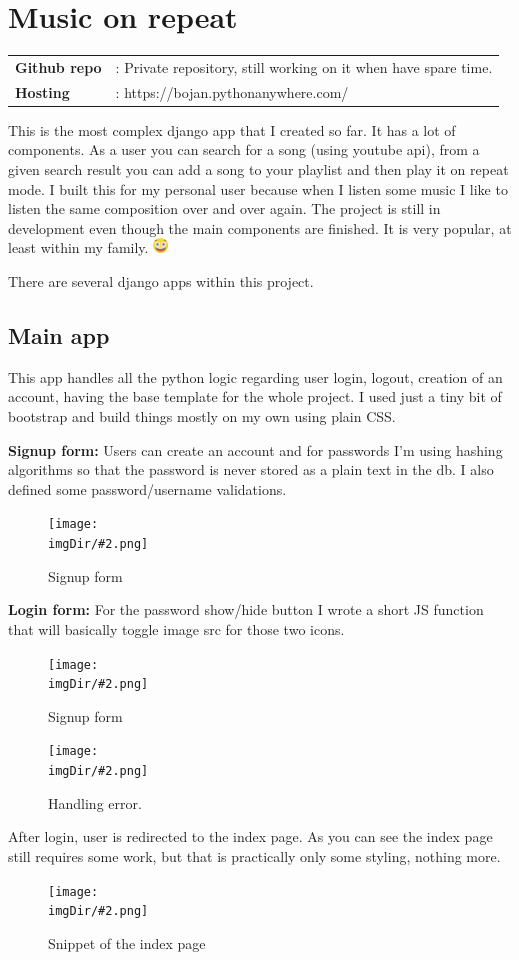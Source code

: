 \documentclass[11pt, onecolumn]{article}
\newcommand{\demo}[2]{%
	\vspace{3mm}
	\begin{tabular}{ll}
		\textbf{Github repo} & : \color{blue}#1\vspace{1mm}\\
		\vspace{2mm}\textbf{Hosting} & : \color{blue}#2 \\
	\end{tabular}
	\vspace{3mm}
}
\newcommand{\fig}[3]{%
	\vspace{-2mm}
	\begin{figure}[H]
		\centering
		\texttt{[image: \\imgDir/\#2.png]}
		\vspace{-3mm}
		\caption[]{#3}
		\label{fig:#2}
	\end{figure}
	\vspace{-2mm}
}
\def\smiley{\includegraphics[width=4mm]{743267}}
\begin{document}
\tableofcontents

\pagebreak
{}

\pagebreak
\section{Music on repeat}
\def\imgDir{codepen}
\demo{\color{black}Private repository, still working on it when have spare time.}{https://bojan.pythonanywhere.com/}

\begin{multicols}{2}

This is the most complex django app that I created so far. It has a lot of components. As a user you can search for a song (using youtube api), from a given search result you can add a song to your playlist and then play it on repeat mode. I built this for my personal user because when I listen some music I like to listen the same composition over and over again. The project is still in development even though the main components are finished. It is very popular, at least within my family. \smiley

There are several django apps within this project.

\subsection*{Main app}

This app handles all the python logic regarding user login, logout, creation of an account, having the base template for the whole project. I used just a tiny bit of bootstrap and build things mostly on my own using plain CSS.

\textbf{Signup form:}
\noindent
Users can create an account and for passwords I'm using hashing algorithms so that the password is never stored as a plain text in the db. I also defined some password/username validations.

\def\imgDir{youtube}
\fig{70mm}{img-1}{Signup form}


\textbf{Login form:} For the password show/hide button I wrote a short JS function that will basically toggle image src for those two icons.
\def\imgDir{youtube}
\fig{70mm}{img-2}{Signup form}
\fig{70mm}{img-5}{Handling error.}

After login, user is redirected to the index page. As you can see the index page still requires some work, but that is practically only some styling, nothing more.
\def\imgDir{youtube}
\fig{70mm}{img-3}{Snippet of the index page}


\end{multicols}
\end{document}
